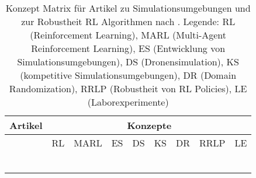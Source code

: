 \begin{longtable}{|l|llllllll|}
    \hline
    \multicolumn{1}{|c|}{Artikel} & \multicolumn{8}{c|}{Konzepte}                                                                                                                                                                \\ \hline
    \endhead
                                  & \multicolumn{1}{l|}{RL} & \multicolumn{1}{l|}{MARL} & \multicolumn{1}{l|}{ES} & \multicolumn{1}{l|}{DS} & \multicolumn{1}{l|}{KS} & \multicolumn{1}{l|}{DR} & \multicolumn{1}{l|}{RRLP} & LE \\ \hline
                                  & \multicolumn{1}{l|}{}   & \multicolumn{1}{l|}{}     & \multicolumn{1}{l|}{}   & \multicolumn{1}{l|}{}   & \multicolumn{1}{l|}{}   & \multicolumn{1}{l|}{}   & \multicolumn{1}{l|}{}     &    \\ \hline
                                  & \multicolumn{1}{l|}{}   & \multicolumn{1}{l|}{}     & \multicolumn{1}{l|}{}   & \multicolumn{1}{l|}{}   & \multicolumn{1}{l|}{}   & \multicolumn{1}{l|}{}   & \multicolumn{1}{l|}{}     &    \\ \hline
                                  & \multicolumn{1}{l|}{}   & \multicolumn{1}{l|}{}     & \multicolumn{1}{l|}{}   & \multicolumn{1}{l|}{}   & \multicolumn{1}{l|}{}   & \multicolumn{1}{l|}{}   & \multicolumn{1}{l|}{}     &    \\ \hline
                                  & \multicolumn{1}{l|}{}   & \multicolumn{1}{l|}{}     & \multicolumn{1}{l|}{}   & \multicolumn{1}{l|}{}   & \multicolumn{1}{l|}{}   & \multicolumn{1}{l|}{}   & \multicolumn{1}{l|}{}     &    \\ \hline
                                  & \multicolumn{1}{l|}{}   & \multicolumn{1}{l|}{}     & \multicolumn{1}{l|}{}   & \multicolumn{1}{l|}{}   & \multicolumn{1}{l|}{}   & \multicolumn{1}{l|}{}   & \multicolumn{1}{l|}{}     &    \\ \hline
    \caption{Konzept Matrix für Artikel zu Simulationsumgebungen und zur Robustheit RL Algorithmen nach \cite[]{10.5555/2017160.2017162}.
    Legende: RL (Reinforcement Learning), MARL (Multi-Agent Reinforcement Learning), ES (Entwicklung von Simulationsumgebungen), DS (Dronensimulation), KS (kompetitive Simulationsumgebungen), DR (Domain Randomization), RRLP (Robustheit von RL Policies), LE (Laborexperimente)}
    \label{tab:research-table}\\
\end{longtable}